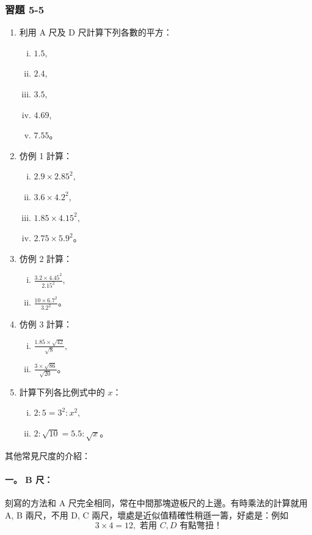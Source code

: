 \subsubsection*{習題 5-5}\label{note:b2-ch5-p123-ex5-5-ref}
\begin{enumerate}
    \item 利用 A 尺及 D 尺計算下列各數的平方：
    \begin{enumerate}[(i)]
        \item $1.5$,
        \item $2.4$,
        \item $3.5$,
        \item $4.69$,
        \item $7.55$。
    \end{enumerate}
    \item 仿例 1 計算：
    \begin{enumerate}[(i)]
        \item $2.9 \times 2.85^2$,
        \item $3.6 \times 4.2^2$,
        \item $1.85 \times 4.15^2$,
        \item $2.75 \times 5.9^2$。
    \end{enumerate}
    \item 仿例 2 計算：
    \begin{enumerate}[(i)]
        \item $\frac{3.2 \times 4.45^2}{2.15^2}$,
        \item $\frac{10 \times 6.7^2}{3.2^2}$。
    \end{enumerate}
    \item 仿例 3 計算：
    \begin{enumerate}[(i)]
        \item $\frac{1.85 \times \sqrt{42}}{\sqrt{8}}$,
        \item $\frac{3 \times \sqrt{86}}{\sqrt{20}}$。
    \end{enumerate}
    \item 計算下列各比例式中的 $x$：
    \begin{enumerate}[(i)]
        \item $2 : 5 = 3^2 : x^2$,
        \item $2 : \sqrt{10} = 5.5 : \sqrt{x}$。
    \end{enumerate}
\end{enumerate}

其他常見尺度的介紹：

\paragraph{一。 B 尺：} 刻寫的方法和 A 尺完全相同，常在中間那塊遊板尺的上邊。有時乘法的計算就用 A, B 兩尺，不用 D, C 兩尺，壞處是近似值精確性稍遜一籌，好處是：例如
\[
3 \times 4 = 12, \text{ 若用 } C, D \text{ 有點彆扭！}
\]

